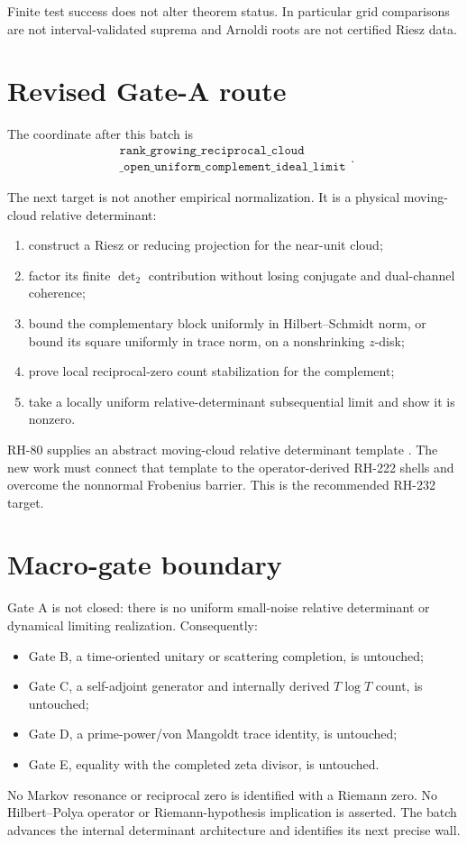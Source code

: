 \documentclass[11pt]{article}
\theoremstyle{remark}\newtheorem{remark}[theorem]{Remark}
\begin{document}
Finite test success does not alter theorem status. In particular grid
comparisons are not interval-validated suprema and Arnoldi roots are not
certified Riesz data.

\section{Revised Gate-A route}

The coordinate after this batch is
\begin{equation}\label{eq:coordinate}
 \boxed{\begin{gathered}
 \texttt{rank\_growing\_reciprocal\_cloud}\\
 \texttt{\_open\_uniform\_complement\_ideal\_limit}
 \end{gathered}}.
\end{equation}

The next target is not another empirical normalization. It is a physical
moving-cloud relative determinant:
\begin{enumerate}[leftmargin=2em]
\item construct a Riesz or reducing projection for the near-unit cloud;
\item factor its finite $\det_2$ contribution without losing conjugate and
dual-channel coherence;
\item bound the complementary block uniformly in Hilbert--Schmidt norm, or
bound its square uniformly in trace norm, on a nonshrinking $z$-disk;
\item prove local reciprocal-zero count stabilization for the complement;
\item take a locally uniform relative-determinant subsequential limit and
show it is nonzero.
\end{enumerate}

RH-80 supplies an abstract moving-cloud relative determinant template
\citep{WangRH80}. The new work must connect that template to the
operator-derived RH-222 shells and overcome the nonnormal Frobenius barrier.
This is the recommended RH-232 target.

\section{Macro-gate boundary}

Gate A is not closed: there is no uniform small-noise relative determinant or
dynamical limiting realization. Consequently:
\begin{itemize}[leftmargin=2em]
\item Gate B, a time-oriented unitary or scattering completion, is untouched;
\item Gate C, a self-adjoint generator and internally derived $T\log T$
count, is untouched;
\item Gate D, a prime-power/von Mangoldt trace identity, is untouched;
\item Gate E, equality with the completed zeta divisor, is untouched.
\end{itemize}

No Markov resonance or reciprocal zero is identified with a Riemann zero. No
Hilbert--Polya operator or Riemann-hypothesis implication is asserted. The
batch advances the internal determinant architecture and identifies its next
precise wall.



\end{document}
